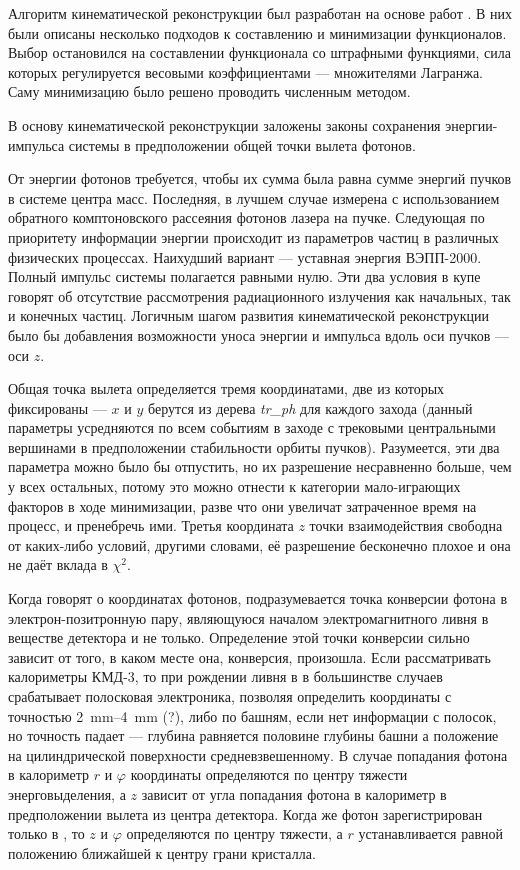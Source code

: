 Алгоритм кинематической реконструкции был разработан на основе работ \cite{Bukin2003-27, Bukin2005-51, Bukin2008-3}.
В них были описаны несколько подходов к составлению и минимизации функционалов.
Выбор остановился на составлении функционала со штрафными функциями,
сила которых регулируется весовыми коэффициентами
---
множителями Лагранжа.
Саму минимизацию было решено проводить численным методом.

В основу кинематической реконструкции заложены законы сохранения энергии-импульса системы в предположении общей точки вылета фотонов.

От энергии фотонов требуется, чтобы их сумма была равна сумме энергий пучков в системе центра масс. Последняя, в лучшем случае измерена с использованием обратного комптоновского рассеяния фотонов лазера на пучке. Следующая по приоритету информации энергии происходит из параметров частиц в различных физических процессах. Наихудший вариант --- уставная энергия ВЭПП-2000. Полный импульс системы полагается равными нулю. Эти два условия в купе говорят об отсутствие рассмотрения радиационного излучения как начальных, так и конечных частиц.
Логичным шагом развития кинематической реконструкции было бы добавления возможности уноса энергии и импульса вдоль оси пучков --- оси $z$.

Общая точка вылета определяется тремя координатами, две из которых фиксированы --- $x$ и $y$ берутся из дерева \textit{tr\_ph} для каждого захода (данный параметры усредняются по всем событиям в заходе с трековыми центральными вершинами в предположении стабильности орбиты пучков).
Разумеется, эти два параметра можно было бы отпустить, но их разрешение несравненно больше, чем у всех остальных, потому это можно отнести к категории мало-играющих факторов в ходе минимизации, разве что они увеличат затраченное время на процесс, и пренебречь ими. 
Третья координата $z$ точки взаимодействия свободна от каких-либо условий, другими словами, её разрешение бесконечно плохое и она не даёт вклада в $\chi^2$.

Когда говорят о координатах фотонов, подразумевается точка конверсии фотона в электрон-позитронную пару, 
являющуюся началом электромагнитного ливня в веществе детектора и не только. 
Определение этой точки конверсии сильно зависит от того, в каком месте она, конверсия, произошла.
Если рассматривать калориметры КМД-3, 
то при рождении ливня в  в большинстве случаев срабатывает полосковая электроника, позволяя определить координаты с точностью \SIrange[range-phrase=--]{2}{4}{\mm} (?), 
либо по башням, если нет информации с полосок, но точность падает --- глубина равняется половине глубины башни а положение на цилиндрической поверхности средневзвешенному. 
В случае попадания фотона в  калориметр $r$ и $\varphi$ координаты определяются по центру тяжести энерговыделения, 
а $z$ зависит от угла попадания фотона в калориметр в предположении вылета из центра детектора. 
Когда же фотон зарегистрирован только в , то $z$ и $\varphi$ определяются по центру тяжести, 
а $r$ устанавливается равной положению ближайшей к центру грани кристалла.

